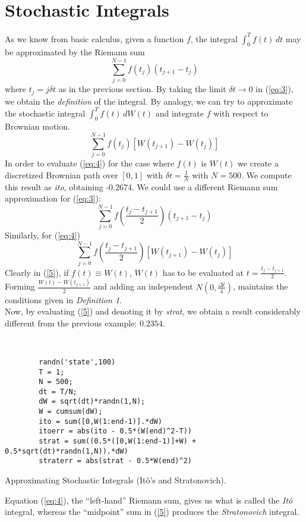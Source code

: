 \documentclass[12pt,a4paper]{article}
\def\d{\delta}
\begin{document}
\section{Stochastic Integrals}
As we know from basic calculus, given a function $f$, the integral $\int_0^T f(t)\,dt$ may be approximated by the Riemann sum 
\begin{equation} \label{eq:3}
\sum_{j=0}^{N-1}f(t_j)(t_{j+1}-t_j)
\end{equation}
where $t_j=j\d t$ as in the previous section. By taking the limit $\d t\rightarrow 0$ in (\ref{eq:3}), we obtain the \textsl{definition} of the integral. By analogy, we can try to approximate the stochastic integral $\int_0^T f(t)\,dW(t)$ and integrate $f$ with respect to Brownian motion. 
\begin{equation} \label{eq:4}
\sum_{j=0}^{N-1}f(t_j)\left[W(t_{j+1})-W(t_j)\right]
\end{equation}
In order to evaluate (\ref{eq:4}) for the case where $f(t)$ is $W(t)$ we create a discretized Brownian path over $[0,1]$ with $\d t=\frac{1}{N}$ with $N=500$. We compute this result as \textsl{ito}, obtaining -0.2674. 
We could use a different Riemann sum approximation for (\ref{eq:3}):
\begin{equation} \label{5}
\sum_{j=0}^{N-1}f\left(\frac{t_j-t_{j+1}}{2}\right)(t_{j+1}-t_j)
\end{equation}
Similarly, for (\ref{eq:4})
\begin{equation} \label{5a}
\sum_{j=0}^{N-1}f\left(\frac{t_j-t_{j+1}}{2}\right)\left[W(t_{j+1})-W(t_j)\right]
\end{equation}
Clearly in (\ref{5}), if $f(t)\equiv W(t)$, $W(t)$ has to be evaluated at $t=\frac{t_j-t_{j+1}}{2}$. Forming $\frac{W(t)-W(t_{j+1})}{2}$ and adding an independent $N\left(0,\frac{\Delta t}{4}\right)$, maintains the conditions given in \textit{Definition 1}. \\

 Now, by evaluating (\ref{5}) and denoting it by \textsl{strat}, we obtain a result considerably different from the previous example: $0.2354$.
\begin{program}
\begin{scriptsize}
				\begin{verbatim}
				
				
        randn('state',100)                      
        T = 1; 
        N = 500; 
        dt = T/N;
        dW = sqrt(dt)*randn(1,N);               
        W = cumsum(dW);                         
        ito = sum([0,W(1:end-1)].*dW)
        itoerr = abs(ito - 0.5*(W(end)^2-T))
        strat = sum((0.5*([0,W(1:end-1)]+W) + 0.5*sqrt(dt)*randn(1,N)).*dW) 
        straterr = abs(strat - 0.5*W(end)^2)
        \end{verbatim}
\end{scriptsize}
  \caption{Approximating Stochastic Integrals (It\^{o}'s and Stratonovich).}
\end{program}
\noindent  Equation (\ref{eq:4}), the ``left-hand'' Riemann sum,  gives us what is called the \textsl{It\^{o}} integral, whereas the ``midpoint'' sum in (\ref{5}) produces the \textsl{Stratonovich} integral. 
\end{document}
